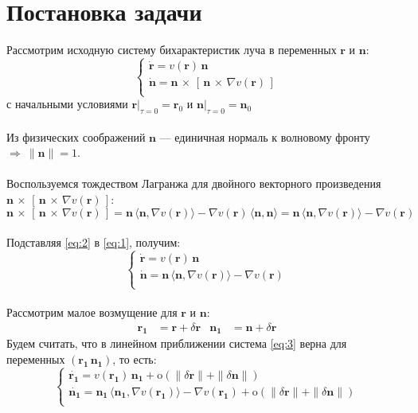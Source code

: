 \documentclass{article}
\newcommand{\bfv}[1]{\mathbf{#1}}
\newcommand{\dd}[1]{\dot{#1}}
\newcommand{\dvp}[3]{#1\,\times\,[\,#2\,\times\,#3\,]}
\newcommand{\dv}[1]{\nabla v(#1)}
\newcommand{\dr}{\delta \bfv{r}}
\newcommand{\dn}{\delta \bfv{n}}
\newcommand{\om}[1]{\mathrm{o}(#1)}
\newcommand{\dprod}[2]{\langle #1, #2 \rangle}
\begin{document}
\section{Постановка задачи}
Рассмотрим исходную систему бихарактеристик луча в переменных $\bfv{r}$ и $\bfv{n}$:
\begin{equation} \label{eq:1}
\begin{cases}
\dd{\bfv{r}} = v(\bfv{r})\,\bfv{n}\\
\dd{\bfv{n}} = \dvp{\bfv{n}}{\bfv{n}}{\dv{\bfv{r}}}\\
\end{cases}
\end{equation}
с начальными условиями $\bfv{r}|_{\tau=0} = \bfv{r}_0$ и $\bfv{n}|_{\tau=0} = \bfv{n}_0$\\\\
Из физических соображений $\bfv{n}$ --- единичная нормаль к волновому фронту $\Rightarrow \ \|\bfv{n}\| = 1$.\\\\
Воспользуемся тождеством Лагранжа для двойного векторного произведения $\dvp{\bfv{n}}{\bfv{n}}{\dv{\bfv{r}}}$:
\begin{equation} \label{eq:2}
    \dvp{\bfv{n}}{\bfv{n}}{\dv{\bfv{r}}} = \bfv{n}\,\dprod{\bfv{n}}{\dv{\bfv{r}}} - \dv{\bfv{r}}\,\dprod{\bfv{n}}{\bfv{n}} = \bfv{n}\,\dprod{\bfv{n}}{\dv{\bfv{r}}} - \dv{\bfv{r}}
\end{equation}\\
Подставляя \eqref{eq:2} в \eqref{eq:1}, получим:\\
\begin{equation} \label{eq:3}
\begin{cases}
\dd{\bfv{r}} = v(\bfv{r})\,\bfv{n}\\
\dd{\bfv{n}} =  \bfv{n}\,\dprod{\bfv{n}}{\dv{\bfv{r}}} - \dv{\bfv{r}}\\
\end{cases}
\end{equation}\\
Рассмотрим малое возмущение для $\bfv{r}$ и $\bfv{n}$:
\begin{align*}
\bfv{r_1} &= \bfv{r} + \dr   &   \bfv{n_1} &= \bfv{n} + \dr
\end{align*}
Будем считать, что в линейном приближении система \eqref{eq:3} верна для переменных $(\bfv{r_1}\,\bfv{n_1})$, то есть: 
\begin{equation} \label{eq:4}
\begin{cases}
\dd{\bfv{r_1}} = v(\bfv{r_1})\,\bfv{n_1} + \om{\|\dr\| + \|\dn\|}\\
\dd{\bfv{n_1}} = \bfv{n_1}\,\dprod{\bfv{n_1}}{\dv{\bfv{r_1}}} - \dv{\bfv{r_1}} + \om{\|\dr\| + \|\dn\|}\\
\end{cases}
\end{equation}\\
\end{document}
